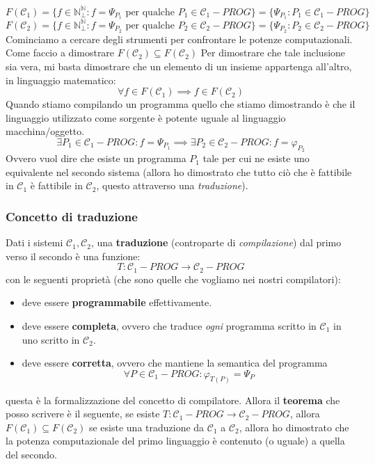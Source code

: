 \documentclass{article}
\begin{document}
$$F(\mathcal{C}_1)=\{f\in\mathbb{N}_\bot^\mathbb{N}: f=\Psi_{P_1}\text{ per qualche }P_1\in\mathcal{C}_1-PROG\}=\{\Psi_{P_1}:P_1\in\mathcal{C}_1-PROG\}$$
$$F(\mathcal{C}_2)=\{f\in\mathbb{N}_\bot^\mathbb{N}: f=\Psi_{P_2}\text{ per qualche }P_2\in\mathcal{C}_2-PROG\}=\{\Psi_{P_2}:P_2\in\mathcal{C}_2-PROG\}$$
Cominciamo a cercare degli strumenti per confrontare le potenze computazionali. Come faccio a dimostrare
$F(\mathcal{C}_2)\subseteq F(\mathcal{C}_2)$
Per dimostrare che tale inclusione sia vera, mi basta dimostrare che un elemento di un insieme appartenga
all'altro, in linguaggio matematico:
$$\forall f\in F(\mathcal{C}_1)\implies f\in F(\mathcal{C}_2)$$
Quando stiamo compilando un programma quello che stiamo dimostrando è che il linguaggio utilizzato
come sorgente è potente uguale al linguaggio macchina/oggetto.
$$\exists P_1\in\mathcal{C}_1-PROG : f=\Psi_{P_1}\implies\exists P_2\in\mathcal{C}_2-PROG:f=\varphi_{P_2}$$
Ovvero vuol dire che esiste un programma $P_1$ tale per cui ne esiste uno equivalente nel secondo
sistema (allora ho dimostrato che tutto ciò che è fattibile in $\mathcal{C}_1$ è fattibile in $\mathcal{C}_2$,
questo attraverso una \textit{traduzione}).

\subsubsection{Concetto di traduzione}
Dati i sistemi $\mathcal{C}_1,\mathcal{C}_2$, una \textbf{traduzione} (controparte di \textit{compilazione}) dal primo verso il secondo è
una funzione:
$$T:\mathcal{C}_1-PROG\rightarrow\mathcal{C}_2-PROG$$
con le seguenti proprietà (che sono quelle che vogliamo nei nostri compilatori):
\begin{itemize}
    \item deve essere \textbf{programmabile} effettivamente.
    \item deve essere \textbf{completa}, ovvero che traduce \textit{ogni} programma scritto in $\mathcal{C}_1$ in
          uno scritto in $\mathcal{C}_2$.
    \item deve essere \textbf{corretta}, ovvero che mantiene la semantica del programma
          $$\forall P\in\mathcal{C}_1-PROG :\varphi_{T(P)}=\Psi_P$$
\end{itemize}
questa è la formalizzazione del concetto di compilatore. Allora il \textbf{teorema} che posso scrivere
è il seguente, se esiste $T:\mathcal{C}_1-PROG\rightarrow\mathcal{C}_2-PROG$, allora $F(\mathcal{C}_1)\subseteq F(\mathcal{C}_2)$
se esiste una traduzione da $\mathcal{C}_1$ a $\mathcal{C}_2$, allora ho dimostrato che la potenza computazionale del
primo linguaggio è contenuto (o uguale) a quella del secondo.
\end{document}
